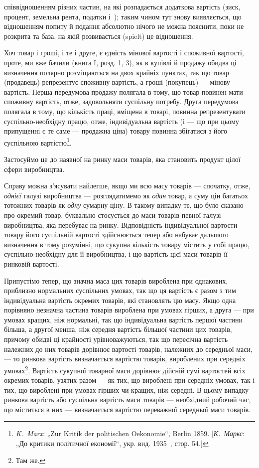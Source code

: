 \parcont{}  %
співвідношенням різних частин, на які розпадається додаткова
вартість (зиск, процент, земельна рента, податки і~); таким
чином тут знову виявляється, що відношенням попиту й подання
абсолютно нічого не можна пояснити, поки не розкрита та база,
на якій розвивається (spielt) це відношення.

Хоч товар і гроші, і те і друге, є єдність мінової вартості
і споживної вартості, проте, ми вже бачили (книга I, розд. 1, 3),
як в купівлі й продажу обидва ці визначення полярно розміщаються на двох крайніх пунктах, так що
товар (продавець)
репрезентує споживну вартість, а гроші (покупець) — мінову вартість. Перша передумова продажу
полягала в тому, що товар
повинен мати споживну вартість, отже, задовольняти суспільну
потребу. Друга передумова полягала в тому, що кількість
праці, вміщена в товарі, повинна репрезентувати суспільно-необхідну працю, отже, індивідуальна
вартість (і — що при цьому
припущенні є те саме — продажна ціна) товару повинна збігатися з його суспільною вартістю\footnote{
\emph{K.~Marx}: „Zur Kritik der politischen Oekonomie“, Berlin 1859. [\emph{К.~Маркс}:
„До критики політичної економії“, укр. вид. 1935~, стор. 54.]
}.

Застосуймо це до наявної на ринку маси товарів, яка становить продукт цілої сфери виробництва.

Справу можна з’ясувати найлегше, якщо ми всю масу товарів — спочатку, отже, \emph{однієї} галузі
виробництва — розглядатимемо
як \emph{один} товар, а суму цін багатьох тотожних товарів як \emph{одну}
сумарну ціну. В такому випадку те, що було сказано про окремий товар, буквально стосується до маси
товарів певної галузі
виробництва, яка перебуває на ринку. Відповідність індивідуальної вартости товару його суспільній
вартості здійснюється тепер
або набуває дальшого визначення в тому розумінні, що сукупна
кількість товару містить у собі працю, суспільно-необхідну для
її виробництва, і що вартість цієї маси товарів \deq{} її ринковій
вартості.

Припустімо тепер, що значна маса цих товарів вироблена
при однакових, приблизно нормальних суспільних умовах, так
що ця вартість є разом з тим індивідуальна вартість окремих
товарів, які становлять цю масу. Якщо одна порівняно незначна
частина товарів вироблена при умовах гірших, а друга — при умовах
кращих, ніж нормальні, так що індивідуальна вартість першої
частини більша, а другої менша, ніж середня вартість більшої частини цих товарів, причому обидві ці
крайності урівноважуються,
так що пересічна вартість належних до них товарів дорівнює
вартості товарів, належних до середньої маси, — то ринкова вартість визначається вартістю товарів,
вироблених при середніх
умовах\footnote{
Там же.
}. Вартість сукупної товарної маси дорівнює дійсній сумі
вартостей всіх окремих товарів, узятих разом — як тих, що вироблені при середніх умовах, так і тих,
що вироблені при умовах
гірших чи кращих, ніж середні. В цьому випадку ринкова
вартість або суспільна вартість маси товарів — необхідний робочий час, що міститься в них —
визначається вартістю переважної середньої маси товарів.

